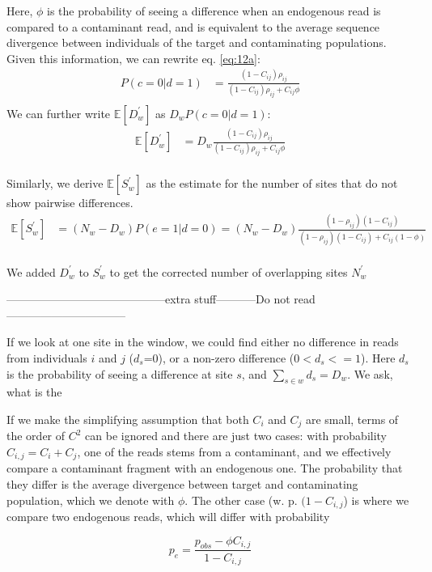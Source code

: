 \documentclass[12pt, letterpaper]{article}
\begin{document}
Here, $\phi$ is the probability of seeing a difference when an endogenous read is compared to a contaminant read, and is equivalent to the average sequence divergence between individuals of the target and contaminating populations.
Given this information, we can rewrite eq. \ref{eq:12a}:
\begin{align}\label{eq:12}
    P(c=0|d=1) &= \frac{(1 - C_{ij}) \rho_{ij}}{(1 - C_{ij}) \rho_{ij} + C_{ij} \phi} \nonumber\\
\end{align}
We can further write $\mathbb{E}[D_w^{'}]$ as $D_w P(c=0|d=1)$:
\begin{align}
    \mathbb{E}[D_w^{'}] &= D_w\frac{(1-C_{ij})\rho_{ij}}{(1-C_{ij}) \rho_{ij} + C_{ij} \phi}\\
\end{align}

Similarly, we derive $\mathbb{E}[S_w^{'}]$ as the estimate for the number of sites that do not show pairwise differences.
\begin{align}
    \mathbb{E}[S_w^{'}] &= (N_w-D_w) P(e=1|d=0) = (N_w - D_w)\frac{(1-\rho_{ij})(1-C_{ij})}{(1-\rho_{ij})(1-C_{ij}) + C_{ij}(1-\phi)}\\
\end{align}

We added $D_w^{'}$ to $S_w^{'}$ to get the corrected number of overlapping sites $N_w^{'}$  

------------------------------------------extra stuff-----------Do not read--------------------------------


If we look at one site in the window, we could find either no difference in reads from individuals $i$ and $j$ ($d_s$=0), or a non-zero difference ($0<d_s<=1$). Here $d_s$ is the probability of seeing a difference at site $s$, and $\sum_{s \in w} d_s =D_w$. We ask, what is the    

If we make the simplifying assumption that both $C_i$ and $C_j$ are small, terms of the order of $C^2$ can be ignored and there are just two cases: with probability $C_{i,j} =C_i + C_j$, one of the reads stems from a contaminant, and we effectively compare a contaminant fragment with an endogenous one. The probability that they differ is the average divergence between target and contaminating population, which we denote with $\phi$. The other case (w. p. $(1-C_{i,j}$) is where we compare two endogenous reads, which will differ with probability

\begin{equation}
    p_{e} = \frac{p_{obs}-\phi C_{i,j}}{1-C_{i,j}}
\end{equation}
\end{document}

